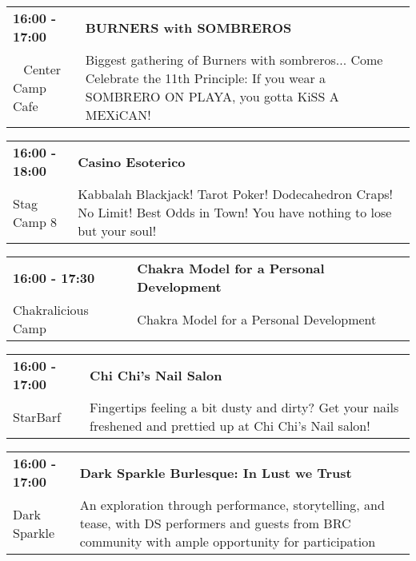 \begin{tabular}{ p{1in} p{2.2in} }
    \textbf{16:00 - 17:00} & \textbf{BURNERS with SOMBREROS} \\
    ~ \newline Center Camp Cafe & Biggest gathering of Burners with sombreros... Come Celebrate the 11th Principle: If you wear a SOMBRERO ON PLAYA, you gotta KiSS A MEXiCAN! \\
    \hline 
\end{tabular}
    
\begin{tabular}{ p{1in} p{2.2in} }
    \textbf{16:00 - 18:00} & \textbf{Casino Esoterico} \\
    Stag Camp 8 \newline  & Kabbalah Blackjack! Tarot Poker! Dodecahedron Craps! No Limit! Best Odds in Town! You have nothing to lose but your soul! \\
    \hline 
\end{tabular}
    
\begin{tabular}{ p{1in} p{2.2in} }
    \textbf{16:00 - 17:30} & \textbf{Chakra Model for a Personal Development} \\
    Chakralicious Camp \newline  & Chakra Model for a Personal Development \\
    \hline 
\end{tabular}
    
\begin{tabular}{ p{1in} p{2.2in} }
    \textbf{16:00 - 17:00} & \textbf{Chi Chi's Nail Salon} \\
    StarBarf \newline  & Fingertips feeling a bit dusty and dirty? Get your nails freshened and prettied up at Chi Chi's Nail salon! \\
    \hline 
\end{tabular}
    
\begin{tabular}{ p{1in} p{2.2in} }
    \textbf{16:00 - 17:00} & \textbf{Dark Sparkle Burlesque: In Lust we Trust} \\
    Dark Sparkle \newline  & An exploration through performance, storytelling, and tease, with DS performers and guests from BRC community with ample opportunity for participation \\
    \hline 
\end{tabular}
    
